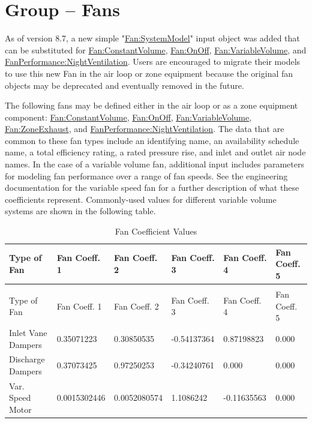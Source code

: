 \section{Group -- Fans}\label{group-fans}

As of version 8.7, a new simple "\hyperref[fansystemmodel]{Fan:SystemModel}" input object was added that can be substituted for \hyperref[fanconstantvolume]{Fan:ConstantVolume}, \hyperref[fanonoff]{Fan:OnOff}, \hyperref[fanvariablevolume]{Fan:VariableVolume}, and \hyperref[fanperformancenightventilation]{FanPerformance:NightVentilation}.  Users are encouraged to migrate their models to use this new Fan in the air loop or zone equipment because the original fan objects may be deprecated and eventually removed in the future.

The following fans may be defined either in the air loop or as a zone equipment component: \hyperref[fanconstantvolume]{Fan:ConstantVolume}, \hyperref[fanonoff]{Fan:OnOff}, \hyperref[fanvariablevolume]{Fan:VariableVolume}, \hyperref[fanzoneexhaust]{Fan:ZoneExhaust}, and \hyperref[fanperformancenightventilation]{FanPerformance:NightVentilation}. The data that are common to these fan types include an identifying name, an availability schedule name, a total efficiency rating, a rated pressure rise, and inlet and outlet air node names. In the case of a variable volume fan, additional input includes parameters for modeling fan performance over a range of fan speeds. See the engineering documentation for the variable speed fan for a further description of what these coefficients represent. Commonly-used values for different variable volume systems are shown in the following table.

\begin{longtable}[c]{p{1.0in}p{1.0in}p{1.0in}p{1.0in}p{1.0in}p{1.0in}}
\caption{Fan Coefficient Values \label{table:fan-coefficient-values}} \tabularnewline
\toprule
Type of Fan & Fan Coeff. 1 & Fan Coeff. 2 & Fan Coeff. 3 & Fan Coeff. 4 & Fan Coeff. 5 \tabularnewline
\midrule
\endfirsthead

\caption[]{Fan Coefficient Values} \tabularnewline
\toprule
Type of Fan & Fan Coeff. 1 & Fan Coeff. 2 & Fan Coeff. 3 & Fan Coeff. 4 & Fan Coeff. 5 \tabularnewline
\midrule
\endhead

Inlet Vane Dampers & 0.35071223 & 0.30850535 & -0.54137364 & 0.87198823 & 0.000 \tabularnewline
Discharge Dampers & 0.37073425 & 0.97250253 & -0.34240761 & 0.000 & 0.000 \tabularnewline
Var. Speed Motor & 0.0015302446 & 0.0052080574 & 1.1086242 & -0.11635563 & 0.000 \tabularnewline
\bottomrule
\end{longtable}


